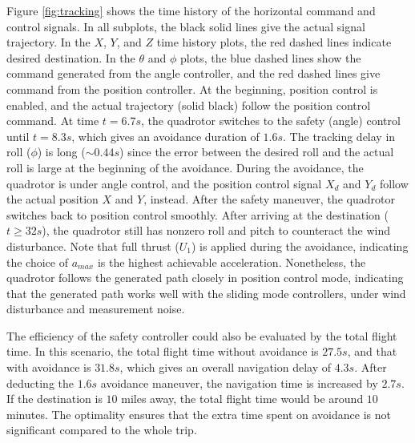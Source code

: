 \documentclass[journal,11pt,onecolumn,draftclsnofoot,]{IEEEtran}
\begin{document}
Figure \ref{fig:tracking} shows the time history of the horizontal command and control signals. In all subplots, the black solid lines give the actual signal trajectory. In the $X$, $Y$, and $Z$ time history plots, the red dashed lines indicate desired destination. In the $\theta$ and $\phi$ plots, the blue dashed lines show the command generated from the angle controller, and the red dashed lines give command from the position controller. At the beginning, position control is enabled, and the actual trajectory (solid black) follow the position control command. At time $t=6.7s$, the quadrotor switches to the safety (angle) control until $t=8.3s$, which gives an avoidance duration of $1.6s$. The tracking delay in roll ($\phi$) is long ($\sim 0.44s$) since the error between the desired roll and the actual roll is large at the beginning of the avoidance. During the avoidance, the quadrotor is under angle control, and the position control signal $X_d$ and $Y_d$ follow the actual position $X$ and $Y$, instead. After the safety maneuver, the quadrotor switches back to position control smoothly. After arriving at the destination ($t \ge 32 s$), the quadrotor still has nonzero roll and pitch to counteract the wind disturbance. Note that full thrust ($U_1$) is applied during the avoidance, indicating the choice of $a_{max}$ is the highest achievable acceleration. Nonetheless, the quadrotor follows the generated path closely in position control mode, indicating that the generated path works well with the sliding mode controllers, under wind disturbance and measurement noise.

The efficiency of the safety controller could also be evaluated by the total flight time. In this scenario, the total flight time without avoidance is $27.5 s$, and that with avoidance is $31.8 s$, which gives an overall navigation delay of $4.3 s$. After deducting the $1.6 s$ avoidance maneuver, the navigation time is increased by $2.7 s$. If the destination is $10$ miles away, the total flight time would be around $10$ minutes. The optimality ensures that the extra time spent on avoidance is not significant compared to the whole trip.
\end{document}
